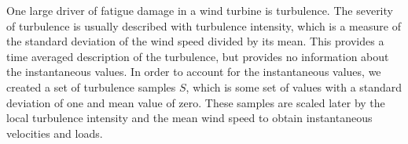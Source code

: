 \documentclass[11pt,letterpaper]{article}
\begin{document}
% 

One large driver of fatigue damage in a wind turbine is turbulence. The severity of turbulence is usually described with turbulence intensity, which is a measure of the standard deviation of the wind speed divided by its mean. This provides a time averaged description of the turbulence, but provides no information about the instantaneous values. In order to account for the instantaneous values, we created a set of turbulence samples $S$, which is some set of values with a standard deviation of one and mean value of zero. These samples are scaled later by the local turbulence intensity and the mean wind speed to obtain instantaneous velocities and loads. 

\end{document}
